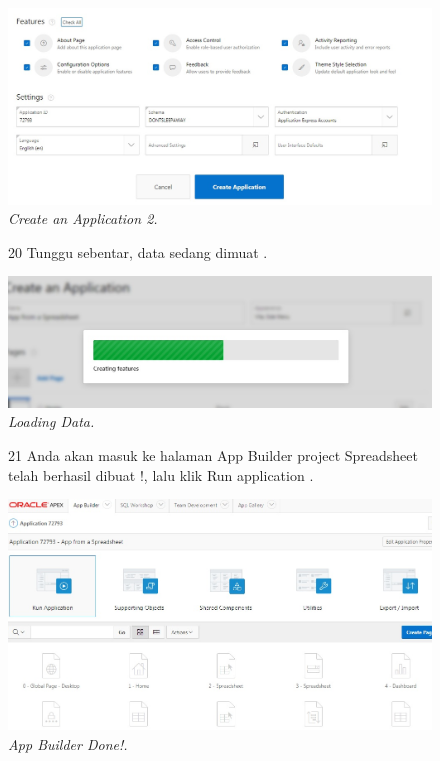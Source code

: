 \begin{enumerate}
\begin{figure}
    \begin{center}
\includegraphics[scale=0.4]{figures/create2.jpg}
    \caption{\textit{Create an Application 2.}}
        \end{center}
\label{gambar}
\end{figure}

\begin{figure}
\item[20]Tunggu sebentar, data sedang dimuat .

    \begin{center}
\includegraphics[scale=0.4]{figures/create3.jpg}
    \caption{\textit{Loading Data.}}
        \end{center}
\label{gambar}
\end{figure}

\begin{figure}
\item[21]Anda akan masuk ke halaman App Builder project Spreadsheet telah berhasil dibuat !, lalu klik Run application .

    \begin{center}
\includegraphics[scale=0.4]{figures/create4.jpg}
    \caption{\textit{App Builder Done!.}}
        \end{center}
\label{gambar}
\end{figure}


\end{enumerate}
